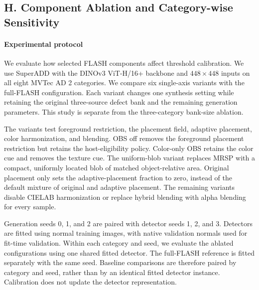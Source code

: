 
\subsection*{H. Component Ablation and Category-wise Sensitivity}
\label{sec:flash_component_ablation}

\paragraph{Experimental protocol}

We evaluate how selected FLASH components affect threshold calibration.
We use SuperADD with the DINOv3 ViT-H/16+ backbone and
$448\times448$ inputs on all eight MVTec AD 2 categories.
We compare six single-axis variants with the full-FLASH configuration.
Each variant changes one synthesis setting while retaining the original
three-source defect bank and the remaining generation parameters.
This study is separate from the three-category bank-size ablation.

The variants test foreground restriction, the placement field, adaptive
placement, color harmonization, and blending.
OBS off removes the foreground placement restriction but retains the
host-eligibility policy.
Color-only OBS retains the color cue and removes the texture cue.
The uniform-blob variant replaces MRSP with a compact, uniformly located
blob of matched object-relative area.
Original placement only sets the adaptive-placement fraction to zero,
instead of the default mixture of original and adaptive placement.
The remaining variants disable CIELAB harmonization or replace hybrid
blending with alpha blending for every sample.

Generation seeds 0, 1, and 2 are paired with detector seeds 1, 2, and 3.
Detectors are fitted using normal training images, with native validation
normals used for fit-time validation.
Within each category and seed, we evaluate the ablated configurations
using one shared fitted detector.
The full-FLASH reference is fitted separately with the same seed.
Baseline comparisons are therefore paired by category and seed, rather
than by an identical fitted detector instance.
Calibration does not update the detector representation.

